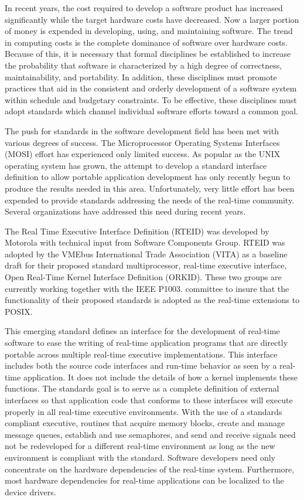 In recent years, the cost required to develop a software product has increased significantly while the target hardware costs have decreased. Now a larger portion of money is expended in developing, using, and maintaining software. The trend in computing costs is the complete dominance of software over hardware costs. Because of this, it is necessary that formal disciplines be established to increase the probability that software is characterized by a high degree of correctness, maintainability, and portability. In addition, these disciplines must promote practices that aid in the consistent and orderly development of a software system within schedule and budgetary constraints. To be effective, these disciplines must adopt standards which channel individual software efforts toward a common goal.

The push for standards in the software development field has been met with various degrees of success. The Microprocessor Operating Systems Interfaces (M\+O\+SI) effort has experienced only limited success. As popular as the U\+N\+IX operating system has grown, the attempt to develop a standard interface definition to allow portable application development has only recently begun to produce the results needed in this area. Unfortunately, very little effort has been expended to provide standards addressing the needs of the real-\/time community. Several organizations have addressed this need during recent years.

The Real Time Executive Interface Definition (R\+T\+E\+ID) was developed by Motorola with technical input from Software Components Group. R\+T\+E\+ID was adopted by the V\+M\+Ebus International Trade Association (V\+I\+TA) as a baseline draft for their proposed standard multiprocessor, real-\/time executive interface, Open Real-\/\+Time Kernel Interface Definition (O\+R\+K\+ID). These two groups are currently working together with the I\+E\+EE P1003. committee to insure that the functionality of their proposed standards is adopted as the real-\/time extensions to P\+O\+S\+IX.

This emerging standard defines an interface for the development of real-\/time software to ease the writing of real-\/time application programs that are directly portable across multiple real-\/time executive implementations. This interface includes both the source code interfaces and run-\/time behavior as seen by a real-\/time application. It does not include the details of how a kernel implements these functions. The standard\textquotesingle{}s goal is to serve as a complete definition of external interfaces so that application code that conforms to these interfaces will execute properly in all real-\/time executive environments. With the use of a standards compliant executive, routines that acquire memory blocks, create and manage message queues, establish and use semaphores, and send and receive signals need not be redeveloped for a different real-\/time environment as long as the new environment is compliant with the standard. Software developers need only concentrate on the hardware dependencies of the real-\/time system. Furthermore, most hardware dependencies for real-\/time applications can be localized to the device drivers.

